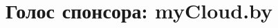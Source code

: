 \documentclass[10pt, a5paper]{article}
\begin{document}
\title{Голос спонсора: myCloud.by}
\date{}
\maketitle%

~
\end{document}
